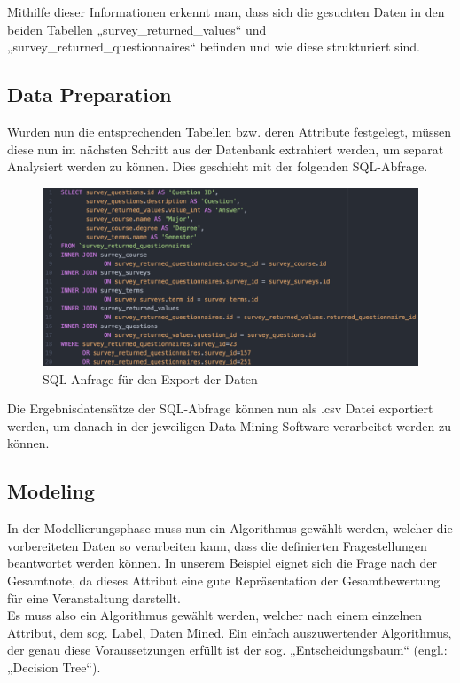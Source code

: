 Mithilfe dieser Informationen erkennt man, dass sich die gesuchten Daten in den
beiden Tabellen „survey\_returned\_values“ und „survey\_returned\_questionnaires“
befinden und wie diese strukturiert sind.

\subsection{Data Preparation}
\label{sec:example:data:dp}

Wurden nun die entsprechenden Tabellen bzw. deren Attribute festgelegt, müssen
diese nun im nächsten Schritt aus der Datenbank extrahiert werden, um separat
Analysiert werden zu können. Dies geschieht mit der folgenden SQL-Abfrage.

\begin{figure}[htb]
	\includegraphics[width=\textwidth]{gfx/sql.png}
	\caption{SQL Anfrage für den Export der Daten}
	\label{fig:example:data:dp:sql}
\end{figure}

Die Ergebnisdatensätze der SQL-Abfrage können nun als .csv Datei exportiert
werden, um danach in der jeweiligen Data Mining Software verarbeitet werden zu
können.

\subsection{Modeling}
\label{sec:example:data:mod}

In der Modellierungsphase muss nun ein Algorithmus gewählt werden, welcher die
vorbereiteten Daten so verarbeiten kann, dass die definierten
Fragestellungen beantwortet werden können. In unserem Beispiel eignet sich die
Frage nach der Gesamtnote, da dieses Attribut eine gute Repräsentation der
Gesamtbewertung für eine Veranstaltung darstellt. \\
Es muss also ein Algorithmus gewählt werden, welcher nach einem einzelnen
Attribut, dem sog. Label, Daten Mined. Ein einfach auszuwertender Algorithmus,
der genau diese Voraussetzungen erfüllt ist der sog. „Entscheidungsbaum“
(engl.: „Decision Tree“).


